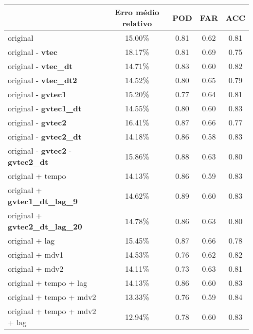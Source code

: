 \begin{table}
\begin{center}
\begin{tabular}{|l|c|c|c|c|} 
\hline
	                          & Erro médio relativo	& POD	& FAR	& ACC  \\ \hline
original                                        & 15.00\%  &  0.81  &  0.62  &  0.81 \\ \hline
original - {\bf vtec}                           & 18.17\%  &  0.81  &  0.69  &  0.75 \\ \hline
original - {\bf vtec\_dt}                       & 14.71\%  &  0.83  &  0.60  &  0.82 \\ \hline
original - {\bf vtec\_dt2}                      & 14.52\%  &  0.80  &  0.65  &  0.79 \\ \hline
original - {\bf gvtec1}                         & 15.20\%  &  0.77  &  0.64  &  0.81 \\ \hline
original - {\bf gvtec1\_dt}                     & 14.55\%  &  0.80  &  0.60  &  0.83 \\ \hline
original - {\bf gvtec2}                         & 16.41\%  &  0.87  &  0.66  &  0.77 \\ \hline
original - {\bf gvtec2\_dt}                     & 14.18\%  &  0.86  &  0.58  &  0.83 \\ \hline
original - {\bf gvtec2} - {\bf gvtec2\_dt}      & 15.86\%  &  0.88  &  0.63  &  0.80 \\ \hline
original + tempo                                & 14.13\%  &  0.86  &  0.59  &  0.83 \\ \hline
original + {\bf gvtec1\_dt\_lag\_9}             & 14.62\%  &  0.89  &  0.60  &  0.83 \\ \hline
original + {\bf gvtec2\_dt\_lag\_20}            & 14.78\%  &  0.86  &  0.63  &  0.80 \\ \hline
original + lag                                  & 15.45\%  &  0.87  &  0.66  &  0.78 \\ \hline
original + mdv1                                 & 14.53\%  &  0.76  &  0.62  &  0.82 \\ \hline
original + mdv2                                 & 14.11\%  &  0.73  &  0.63  &  0.81 \\ \hline
original + tempo + lag                          & 14.13\%  &  0.86  &  0.60  &  0.83 \\ \hline
original + tempo + mdv2                         & 13.33\%  &  0.76  &  0.59  &  0.84 \\ \hline
original + tempo + mdv2 + lag                   & 12.94\%  &  0.78  &  0.60  &  0.83 \\ \hline

\end{tabular}
\end{center}
\end{table}
